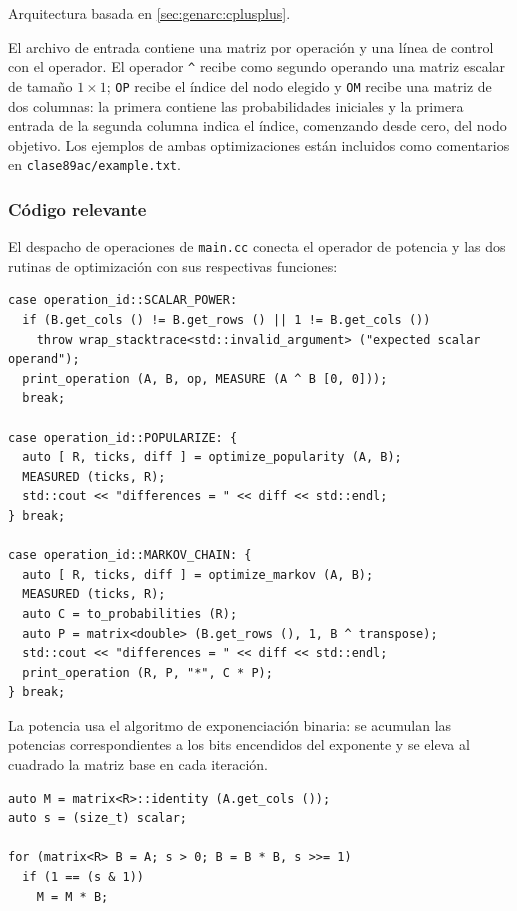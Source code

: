 \documentclass{article}[12pt,a4paper]
\begin{document}
Arquitectura basada en \ref{sec:genarc:cplusplus}.

El archivo de entrada contiene una matriz por operación y una línea de control con el operador. El operador \texttt{^} recibe como segundo operando una matriz escalar de tamaño \(1\times1\); \texttt{OP} recibe el índice del nodo elegido y \texttt{OM} recibe una matriz de dos columnas: la primera contiene las probabilidades iniciales y la primera entrada de la segunda columna indica el índice, comenzando desde cero, del nodo objetivo. Los ejemplos de ambas optimizaciones están incluidos como comentarios en \texttt{clase89ac/example.txt}.

\subsubsection{Código relevante}

El despacho de operaciones de \texttt{main.cc} conecta el operador de potencia y las dos rutinas de optimización con sus respectivas funciones:

\begin{verbatim}
case operation_id::SCALAR_POWER:
  if (B.get_cols () != B.get_rows () || 1 != B.get_cols ())
    throw wrap_stacktrace<std::invalid_argument> ("expected scalar operand");
  print_operation (A, B, op, MEASURE (A ^ B [0, 0]));
  break;

case operation_id::POPULARIZE: {
  auto [ R, ticks, diff ] = optimize_popularity (A, B);
  MEASURED (ticks, R);
  std::cout << "differences = " << diff << std::endl;
} break;

case operation_id::MARKOV_CHAIN: {
  auto [ R, ticks, diff ] = optimize_markov (A, B);
  MEASURED (ticks, R);
  auto C = to_probabilities (R);
  auto P = matrix<double> (B.get_rows (), 1, B ^ transpose);
  std::cout << "differences = " << diff << std::endl;
  print_operation (R, P, "*", C * P);
} break;
\end{verbatim}

La potencia usa el algoritmo de exponenciación binaria: se acumulan las potencias correspondientes a los bits encendidos del exponente y se eleva al cuadrado la matriz base en cada iteración.

\begin{verbatim}
auto M = matrix<R>::identity (A.get_cols ());
auto s = (size_t) scalar;

for (matrix<R> B = A; s > 0; B = B * B, s >>= 1)
  if (1 == (s & 1))
    M = M * B;
\end{verbatim}
\end{document}
